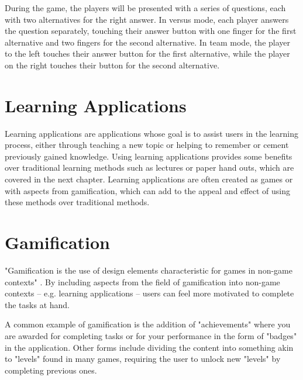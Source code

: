 During the game, the players will be presented with a series of questions, each with two alternatives for the right answer. In versus mode, each player answers the question separately, touching their answer button with one finger for the first alternative and two fingers for the second alternative. In team mode, the player to the left touches their answer button for the first alternative, while the player on the right touches their button for the second alternative.


\section{Learning Applications}

Learning applications are applications whose goal is to assist users in the learning process, either through teaching a new topic or helping to remember or cement previously gained knowledge. Using learning applications provides some benefits over traditional learning methods such as lectures or paper hand outs, which are covered in the next chapter. Learning applications are often created as games or with aspects from gamification, which can add to the appeal and effect of using these methods over traditional methods.


\section{Gamification}

"Gamification is the use of design elements characteristic for games in non-game contexts" \citep{Deterding}. By including aspects from the field of gamification into non-game contexts – e.g. learning applications – users can feel more motivated to complete the tasks at hand.

A common example of gamification is the addition of "achievements" where you are awarded for completing tasks or for your performance in the form of "badges" in the application. Other forms include dividing the content into something akin to "levels" found in many games, requiring the user to unlock new "levels" by completing previous ones.